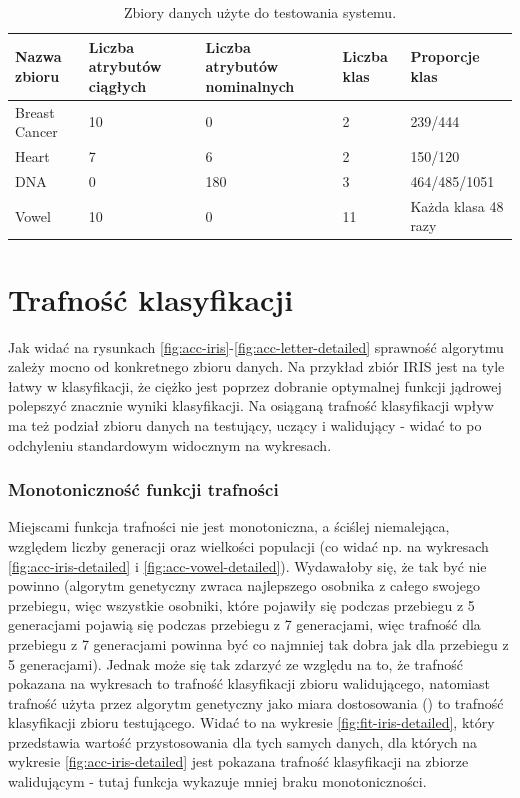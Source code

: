 \begin{table}[ht]
\caption{Zbiory danych użyte do testowania systemu.\label{tab:datasets2}} 	
	\begin{tabular}{|p{2.5cm}|p{2.5cm}|p{2.5cm}|p{1.5cm}|p{3cm}|}
	\hline 
	Nazwa zbioru & Liczba atrybutów ciągłych & Liczba atrybutów nominalnych & Liczba klas & Proporcje klas \\ 
	\hline 
	Breast Cancer & 10 & 0 & 2 & 239/444 \\ 
	\hline 
	Heart  & 7 & 6 & 2 & 150/120  \\ 
	\hline 
	DNA & 0 & 180 & 3 & 464/485/1051  \\ 
	\hline 
	Vowel & 10 & 0 & 11 & Każda klasa 48 razy \\ 
	\hline 
	\end{tabular} 
\end{table}

	
\FloatBarrier
\section{Trafność klasyfikacji}
	Jak widać na rysunkach \ref{fig:acc-iris}-\ref{fig:acc-letter-detailed} sprawność algorytmu zależy mocno od konkretnego zbioru danych. Na przykład zbiór IRIS jest na tyle łatwy w klasyfikacji, że ciężko jest poprzez dobranie optymalnej funkcji jądrowej polepszyć znacznie wyniki klasyfikacji.
	Na osiąganą trafność klasyfikacji wpływ ma też podział zbioru danych na testujący, uczący i walidujący - widać to po odchyleniu standardowym widocznym na wykresach.
	
	\subsubsection{Monotoniczność funkcji trafności}
	
	Miejscami funkcja trafności nie jest monotoniczna, a ściślej niemalejąca, względem liczby generacji oraz wielkości populacji (co widać np. na wykresach \ref{fig:acc-iris-detailed} i \ref{fig:acc-vowel-detailed}). Wydawałoby się, że tak być nie powinno (algorytm genetyczny zwraca najlepszego osobnika z całego swojego przebiegu, więc wszystkie osobniki, które pojawiły się podczas przebiegu z 5 generacjami pojawią się podczas przebiegu z 7 generacjami, więc trafność dla przebiegu z 7 generacjami powinna być co najmniej tak dobra jak dla przebiegu z 5 generacjami). Jednak może się tak zdarzyć ze względu na to, że trafność pokazana na wykresach to trafność klasyfikacji zbioru walidującego, natomiast trafność użyta przez algorytm genetyczny jako miara dostosowania () to trafność klasyfikacji zbioru testującego. Widać to na wykresie \ref{fig:fit-iris-detailed}, który przedstawia wartość przystosowania dla tych samych danych, dla których na wykresie \ref{fig:acc-iris-detailed} jest pokazana trafność klasyfikacji na zbiorze walidującym - tutaj funkcja wykazuje mniej braku monotoniczności. 
	
